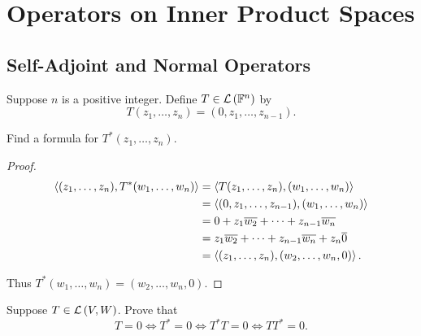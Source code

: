 \chapter{Operators on Inner Product Spaces}

\section{Self-Adjoint and Normal Operators}

\begin{exercise}
    Suppose $n$ is a positive integer. Define $T\in\mathcal{L}\left({\mathbb{F}^{n}}\right)$ by
    \[
        T(z_{1}, \ldots, z_{n}) = (0, z_{1}, \ldots, z_{n-1}).
    \]

    Find a formula for $T^{*}(z_{1}, \ldots, z_{n})$.
\end{exercise}

\begin{proof}
    \begin{align*}
        \left\langle{(z_{1}, \ldots, z_{n}), T^{*}(w_{1}, \ldots, w_{n})}\right\rangle & = \left\langle{T(z_{1}, \ldots, z_{n}), (w_{1}, \ldots, w_{n})}\right\rangle      \\
                                                                        & = \left\langle{(0, z_{1}, \ldots, z_{n-1}), (w_{1}, \ldots, w_{n})}\right\rangle  \\
                                                                        & = 0 + z_{1}\overline{w_{2}} + \cdots + z_{n-1}\overline{w_{n}}             \\
                                                                        & = z_{1}\overline{w_{2}} + \cdots + z_{n-1}\overline{w_{n}} + z_{n}\overline{0} \\
                                                                        & = \left\langle{(z_{1}, \ldots, z_{n}), (w_{2}, \ldots, w_{n}, 0)}\right\rangle.
    \end{align*}

    Thus $T^{*}(w_{1}, \ldots, w_{n}) = (w_{2}, \ldots, w_{n}, 0)$.
\end{proof}
\newpage

\begin{exercise}\label{chapter7:sectionA:exercise2}
    Suppose $T\in\mathcal{L}\left({V, W}\right)$. Prove that
    \[
        T = 0 \Longleftrightarrow T^{*} = 0 \Longleftrightarrow T^{*}T = 0 \Longleftrightarrow TT^{*} = 0.
    \]
\end{exercise}

